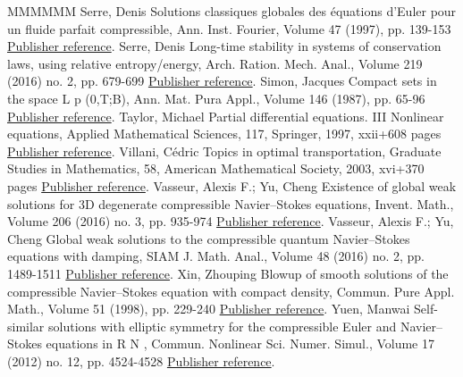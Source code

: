 \begin{thebibliography}{MMMMMM}
 Serre, Denis Solutions classiques globales des équations d’Euler pour un fluide parfait compressible, Ann. Inst. Fourier, Volume 47 (1997), pp. 139-153 \href{https://ahl.centre-mersenne.org/item/AHL_2018__1__47_0/#Serre97}{Publisher reference}.
 Serre, Denis Long-time stability in systems of conservation laws, using relative entropy/energy, Arch. Ration. Mech. Anal., Volume 219 (2016) no. 2, pp. 679-699 \href{https://ahl.centre-mersenne.org/item/AHL_2018__1__47_0/#Serre2017}{Publisher reference}.
 Simon, Jacques Compact sets in the space L p (0,T;B), Ann. Mat. Pura Appl., Volume 146 (1987), pp. 65-96 \href{https://ahl.centre-mersenne.org/item/AHL_2018__1__47_0/#Simon87}{Publisher reference}.
 Taylor, Michael Partial differential equations. III Nonlinear equations, Applied Mathematical Sciences, 117, Springer, 1997, xxii+608 pages \href{https://ahl.centre-mersenne.org/item/AHL_2018__1__47_0/#Taylor3}{Publisher reference}.
 Villani, Cédric Topics in optimal transportation, Graduate Studies in Mathematics, 58, American Mathematical Society, 2003, xvi+370 pages \href{https://ahl.centre-mersenne.org/item/AHL_2018__1__47_0/#Vi03}{Publisher reference}.
 Vasseur, Alexis F.; Yu, Cheng Existence of global weak solutions for 3D degenerate compressible Navier–Stokes equations, Invent. Math., Volume 206 (2016) no. 3, pp. 935-974 \href{https://ahl.centre-mersenne.org/item/AHL_2018__1__47_0/#VasseurYuInventiones}{Publisher reference}.
 Vasseur, Alexis F.; Yu, Cheng Global weak solutions to the compressible quantum Navier–Stokes equations with damping, SIAM J. Math. Anal., Volume 48 (2016) no. 2, pp. 1489-1511 \href{https://ahl.centre-mersenne.org/item/AHL_2018__1__47_0/#VasseurYu}{Publisher reference}.
 Xin, Zhouping Blowup of smooth solutions of the compressible Navier–Stokes equation with compact density, Commun. Pure Appl. Math., Volume 51 (1998), pp. 229-240 \href{https://ahl.centre-mersenne.org/item/AHL_2018__1__47_0/#Xin98}{Publisher reference}.
 Yuen, Manwai Self-similar solutions with elliptic symmetry for the compressible Euler and Navier–Stokes equations in R N , Commun. Nonlinear Sci. Numer. Simul., Volume 17 (2012) no. 12, pp. 4524-4528 \href{https://ahl.centre-mersenne.org/item/AHL_2018__1__47_0/#Yuen12}{Publisher reference}.
\end{thebibliography}
